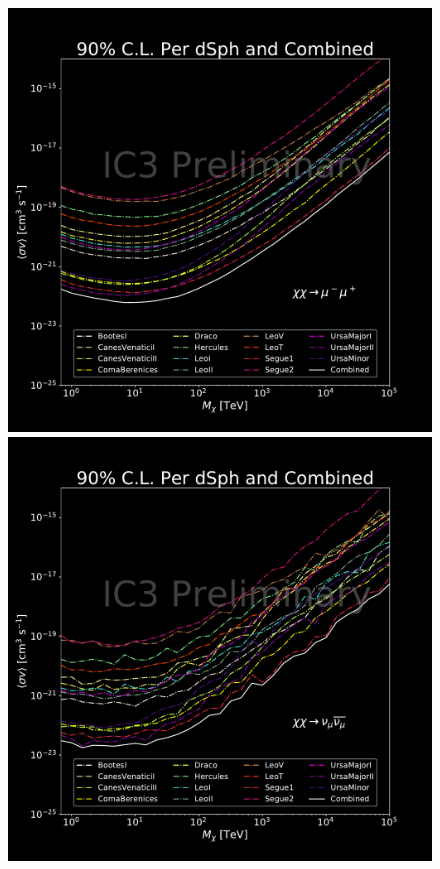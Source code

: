 \begin{figure}[h!]
{        \includegraphics[scale=0.265]{figures/ic_DM/dm_plots/mumu_money_plot_comb.pdf}
        \includegraphics[scale=0.265]{figures/ic_DM/dm_plots/numunumu_money_plot_comb.pdf}
}
\end{figure}
